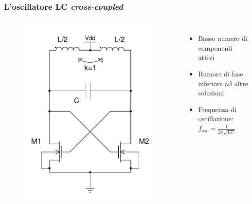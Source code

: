\documentclass{beamer}
\begin{document}
\begin{frame}
\frametitle{L'oscillatore LC \emph{cross-coupled}}
\begin{columns}
	\begin{flushleft}
      \begin{figure}
      \includegraphics[width=\textwidth]{images/LCosc.pdf}
      \end{figure}
	\end{flushleft}
	
	\begin{itemize}
		\item Basso numero di componenti attivi
		\bigskip
		\item Rumore di fase inferiore ad altre soluzioni
		\bigskip
		\item Frequenza di oscillazione:\\
			\smallskip
			{\large $ f_{osc} = \frac{1}{2\pi\sqrt{LC}}$}
	\end{itemize}
\end{columns}
\end{frame}
\end{document}
